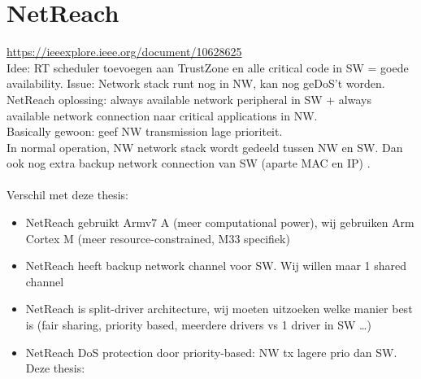 \section{NetReach}
\url{https://ieeexplore.ieee.org/document/10628625}\\
Idee: RT scheduler toevoegen aan TrustZone en alle critical code in SW = goede availability. Issue: Network stack runt nog in NW, kan nog geDoS't worden.\\
NetReach oplossing: always available network peripheral in SW + always available network connection naar critical applications in NW.\\ 
Basically gewoon: geef NW transmission lage prioriteit.\\
In normal operation, NW network stack wordt gedeeld tussen NW en SW. Dan ook nog extra backup network connection van SW (aparte MAC en IP) .\\
\\
Verschil met deze thesis: \begin{itemize}
    \item NetReach gebruikt Armv7 A (meer computational power), wij gebruiken Arm Cortex M (meer resource-constrained, M33 specifiek)
    \item NetReach heeft backup network channel voor SW. Wij willen maar 1 shared channel 
    \item NetReach is split-driver architecture, wij moeten uitzoeken welke manier best is (fair sharing, priority based, meerdere drivers vs 1 driver in SW \dots)
    \item NetReach DoS protection door priority-based: NW tx lagere prio dan SW. Deze thesis: 
\end{itemize}
